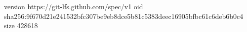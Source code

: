 version https://git-lfs.github.com/spec/v1
oid sha256:9f670d21e241532bfc307be9eb8dce5b81c5383deec16905bfbc61c6deb6b0c4
size 428618
